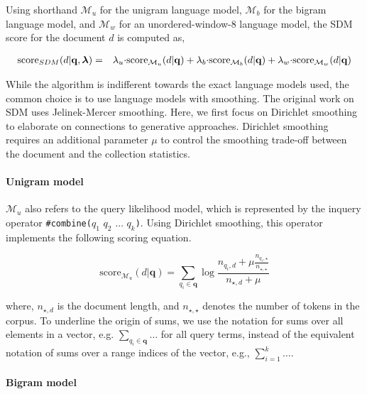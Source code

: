 \documentclass[]{article}
\begin{document}
Using shorthand $\mathcal{M}_{u}$ for the unigram language model,
$\mathcal{M}_{b}$ for the bigram language model, and $\mathcal{M}_{w}$
for an unordered-window-8 language model, the SDM score for the document
$d$ is computed as,

\begin{eqnarray}
\mbox{score}_{SDM}(d|\mathbf{q},\boldsymbol{\lambda}) & = & \lambda_{u}\mbox{\ensuremath{\cdot}}\mbox{score}_{\mathcal{M}_{u}}(d|\mathbf{q})+\lambda_{b}\mbox{\ensuremath{\cdot}}\mbox{score}_{\mathcal{M}_{b}}(d|\mathbf{q}) + \lambda_{w}\mbox{\ensuremath{\cdot}}\mbox{score}_{\mathcal{M}_{w}}(d|\mathbf{q})\label{eq:sdm-scoring}
\end{eqnarray}

While the algorithm is indifferent towards the exact language models
used, the common choice is to use language models with smoothing. The
original work on SDM uses Jelinek-Mercer smoothing. Here, we first
focus on Dirichlet smoothing to elaborate on connections to generative
approaches. Dirichlet smoothing requires an additional parameter $\mu$
to control the smoothing trade-off between the document and the collection
statistics.

\paragraph*{Unigram model}

$\mathcal{M}_{u}$ also refers to the query likelihood model, which is
represented by the inquery \cite{callan1995inquery} operator \texttt{\#combine(}$q_{1}$
$q_{2}$ $\dots$ $q_{k}$\texttt{)}. Using Dirichlet smoothing, this operator implements the following
scoring equation.

\begin{equation}
\mbox{score}_{\mathcal{M}_{u}}(d|\mathbf{q})=\sum_{q_{i}\in\mathbf{q}}\log\frac{n_{q_{i},d}+\mu\frac{n_{q_{i},\star}}{n_{\star,\star}}}{n_{\star,d}+\mu}\label{eq:unigram-model}
\end{equation}

where, $n_{\star,d}$ is the document length, and $n_{\star,\star}$
denotes the number of tokens in the corpus. To underline the origin
of sums, we use the notation for sums over all elements in a vector, e.g.
$\sum_{q_{i}\in\mathbf{q}}\dots$ for all query terms, instead of
the equivalent notation of sums over a range indices of the vector,
e.g., $\sum_{i=1}^{k}\dots$.

\paragraph*{Bigram model}
\end{document}
